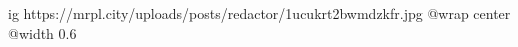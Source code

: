  
 
 
 
 

\ifcmt
  ig https://mrpl.city/uploads/posts/redactor/1ucukrt2bwmdzkfr.jpg
  @wrap center
  @width 0.6
\fi
